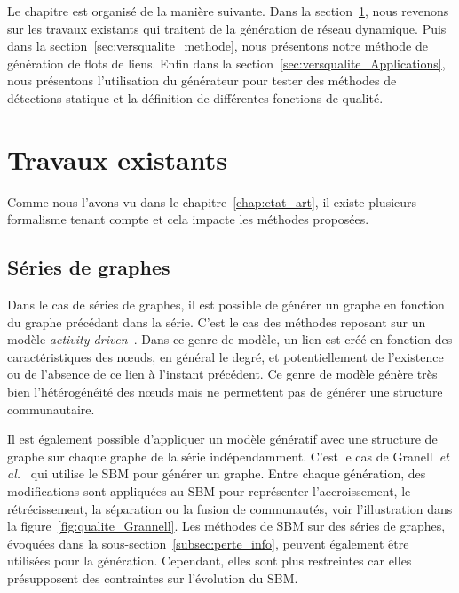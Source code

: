 Le chapitre est organisé de la manière suivante.
Dans la section~\ref{sec:versqualite_existant}, nous revenons sur les travaux existants qui traitent de la génération de réseau dynamique.
Puis dans la section~\ref{sec:versqualite_methode}, nous présentons notre méthode de génération de flots de liens.
Enfin dans la section~\ref{sec:versqualite_Applications}, nous présentons l'utilisation du générateur pour tester des méthodes de détections statique et la définition de différentes fonctions de qualité.

\section{Travaux existants}
\label{sec:versqualite_existant}

Comme nous l'avons vu dans le chapitre~\ref{chap:etat_art}, il existe plusieurs formalisme tenant compte et cela impacte les méthodes proposées.

\subsection{Séries de graphes}
Dans le cas de séries de graphes, il est possible de générer un graphe en fonction du graphe précédant dans la série.
C'est le cas des méthodes reposant sur un modèle \emph{activity driven}~\cite{Perra2012,Laurent2015a,Moinet2015}.
Dans ce genre de modèle, un lien est créé en fonction des caractéristiques des n\oe uds, en général le degré, et potentiellement de l'existence ou de l'absence de ce lien à l'instant précédent.
Ce genre de modèle génère très bien l'hétérogénéité des n\oe uds mais ne permettent pas de générer une structure communautaire.


Il est également possible d'appliquer un modèle génératif avec une structure de graphe sur chaque graphe de la série indépendamment.
C'est le cas de Granell~\emph{et al.}~\cite{Granell2015a} qui utilise le SBM pour générer un graphe.
Entre chaque génération, des modifications sont appliquées au SBM pour représenter l'accroissement, le rétrécissement, la séparation ou la fusion de communautés, voir l'illustration dans la figure~\ref{fig:qualite_Grannell}.
Les méthodes de SBM sur des séries de graphes, évoquées dans la sous-section~\ref{subsec:perte_info}, peuvent également être utilisées pour la génération.
Cependant, elles sont plus restreintes car elles présupposent des contraintes sur l'évolution du SBM.

